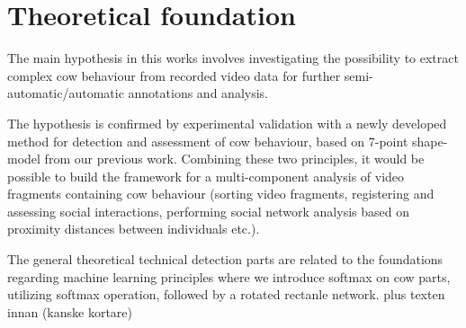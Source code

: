 \documentclass[10pt,a4paper]{article}
\begin{document}
\section{Theoretical foundation}

The main hypothesis in this works involves investigating the possibility to extract complex cow behaviour from recorded video data for further semi-automatic/automatic annotations and analysis. 

The hypothesis is confirmed by experimental validation with a newly developed method for detection and assessment of cow behaviour, based on 7-point shape-model \cite{guzhva2016feasibility} from our previous work. Combining these two principles, it would be possible to build the framework for a multi-component analysis of video fragments containing cow behaviour (sorting video fragments, registering and assessing social interactions, performing social network analysis based on proximity distances between individuals etc.).

The general theoretical technical detection parts are related to the foundations regarding machine learning principles where we introduce softmax on cow parts, utilizing softmax operation, followed by a rotated rectanle network.
plus texten innan (kanske kortare)
\end{document}

